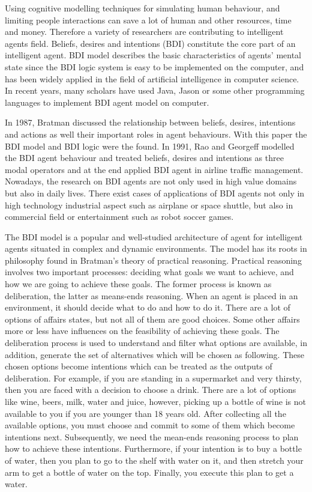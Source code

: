 Using cognitive modelling techniques for simulating human behaviour, and limiting people interactions can save a lot of human and other resources, time and money. Therefore a variety of researchers are contributing to intelligent agents field. Beliefs, desires and intentions (BDI) constitute the core part of an intelligent agent. BDI model describes the basic characteristics of agents' mental state since the BDI logic system is easy to be implemented on the computer, and has been widely applied in the field of artificial intelligence in computer science. In recent years, many scholars have used Java, Jason or some other programming languages to implement BDI agent model on computer.

In 1987, Bratman\cite{MICHAEL_PlansResource_1988} discussed the relationship between beliefs, desires, intentions and actions as well their important roles in agent behaviours. With this paper the BDI model and BDI logic were the found. In 1991, Rao and Georgeff\cite{Michael_BDIAgency_1999} modelled the BDI agent behaviour and treated beliefs, desires and intentions as three modal operators and at the end applied BDI agent in airline traffic management. Nowadays, the research on BDI agents are not only used in high value domains but also in daily lives. There exist cases of applications of BDI agents not only in high technology industrial aspect such as airplane or space shuttle, but also in commercial field or entertainment such as robot soccer games.

The BDI model is a popular and well-studied architecture of agent for intelligent agents situated in complex and dynamic environments. The model has its roots in philosophy found in Bratman’s theory of practical reasoning\cite{Sebastian_Hierarchical_2006}. Practical reasoning involves two important processes: deciding what goals we want to achieve, and how we are going to achieve these goals. The former process is known as deliberation, the latter as means-ends reasoning\cite{Gerhard_MultiSystem_1999}. When an agent is placed in an environment, it should decide what to do and how to do it. There are a lot of options of affairs states, but not all of them are good choices. Some other affairs more or less have influences on the feasibility of achieving these goals. The deliberation process is used to understand and filter what options are available, in addition, generate the set of alternatives which will be chosen as following. These chosen options become intentions which can be treated as the outputs of deliberation. For example, if you are standing in a supermarket and very thirsty, then you are faced with a decision to choose a drink. There are a lot of options like wine, beers, milk, water and juice, however, picking up a bottle of wine is not available to you if you are younger than 18 years old. After collecting all the available options, you must choose and commit to some of them which become intentions next. Subsequently, we need the mean-ends reasoning process to plan how to achieve these intentions. Furthermore, if your intention is to buy a bottle of water, then you plan to go to the shelf with water on it, and then stretch your arm to get a bottle of water on the top. Finally, you execute this plan to get a water.


